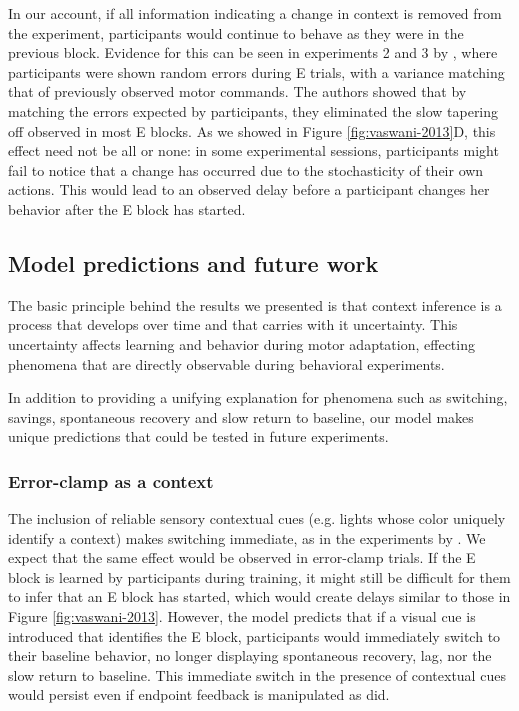 \documentclass[a4paper,doc,floatsintext,natbib]{apa6}
\def \fref #1{Figure \ref{#1}}     %
\begin{document}
In our account, if all information indicating a change in context is removed from the experiment, participants would continue to behave as they were in the previous block. Evidence for this can be seen in experiments 2 and 3 by \cite{Vaswani_Decay_2013}, where participants were shown random errors during E trials, with a variance matching that of previously observed motor commands. The authors showed that by matching the errors expected by participants, they eliminated the slow tapering off observed in most E blocks. As we showed in \fref{fig:vaswani-2013}D, this effect need not be all or none: in some experimental sessions, participants might fail to notice that a change has occurred due to the stochasticity of their own actions. This would lead to an observed delay before a participant changes her behavior after the E block has started.


\subsection{Model predictions and future work}
The basic principle behind the results we presented is that context inference is a process that develops over time and that carries with it uncertainty. This uncertainty affects learning and behavior during motor adaptation, effecting phenomena that are directly observable during behavioral experiments.

In addition to providing a unifying explanation for phenomena such as switching, savings, spontaneous recovery and slow return to baseline, our model makes unique predictions that could be tested in future experiments.

\subsubsection{Error-clamp as a context}
The inclusion of reliable sensory contextual cues (e.g. lights whose color uniquely identify a context) makes switching immediate, as in the experiments by \cite{Kim_Neural_2015}. We expect that the same effect would be observed in error-clamp trials. If the E block is learned by participants during training, it might still be difficult for them to infer that an E block has started, which would create delays similar to those in \fref{fig:vaswani-2013}. However, the model predicts that if a visual cue is introduced that identifies the E block, participants would immediately switch to their baseline behavior, no longer displaying spontaneous recovery, lag, nor the slow return to baseline. This immediate switch in the presence of contextual cues would persist even if endpoint feedback is manipulated as \cite{Vaswani_Decay_2013} did.
\end{document}
